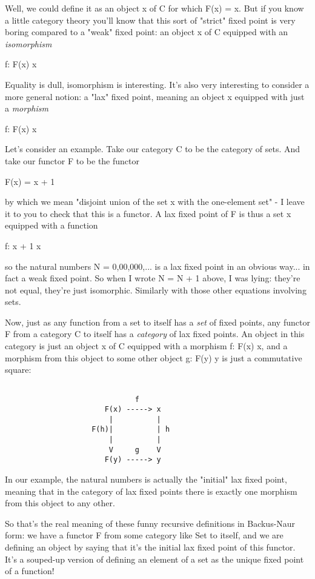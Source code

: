 Well, we could define it as an object x of C for which F(x) = x.  
But if you know a little category theory you'll know that this sort of
"strict" fixed point is very boring compared to a "weak" fixed point:
an object x of C equipped with an \emph{isomorphism} 

f: F(x) \to  x

Equality is dull, isomorphism is interesting.  It's also very
interesting to consider a more general notion: a "lax" fixed point,
meaning an object x equipped with just a \emph{morphism}

f: F(x) \to  x

Let's consider an example.  Take our category C to be the category
of sets.  And take our functor F to be the functor 

F(x) = x + 1

by which we mean "disjoint union of the set x with the one-element set"
- I leave it to you to check that this is a functor.  A lax fixed
point of F is thus a set x equipped with a function

f: x + 1 \to  x

so the natural numbers N = {0,00,000,...} is a lax fixed point in an
obvious way... in fact a weak fixed point.  So when I wrote N = N + 1
above, I was lying: they're not equal, they're just isomorphic.
Similarly with those other equations involving sets.

Now, just as any function from a set to itself has a \emph{set} of fixed
points, any functor F from a category C to itself has a \emph{category} of
lax fixed points.  An object in this category is just an object x of C
equipped with a morphism f: F(x) \to  x, and a morphism from this object
to some other object g: F(y) \to  y is just a commutative square:

\begin{verbatim}

                              f
                       F(x) -----> x
                        |          |
                    F(h)|          | h
                        |          |
                        V     g    V
                       F(y) -----> y

\end{verbatim}
    
In our example, the natural numbers is actually the "initial" lax
fixed point, meaning that in the category of lax fixed points there
is exactly one morphism from this object to any other.  

So that's the real meaning of these funny recursive definitions in 
Backus-Naur form: we have a functor F from some category like Set to
itself, and we are defining an object by saying that it's the initial
lax fixed point of this functor.  It's a souped-up version of defining
an element of a set as the unique fixed point of a function!

